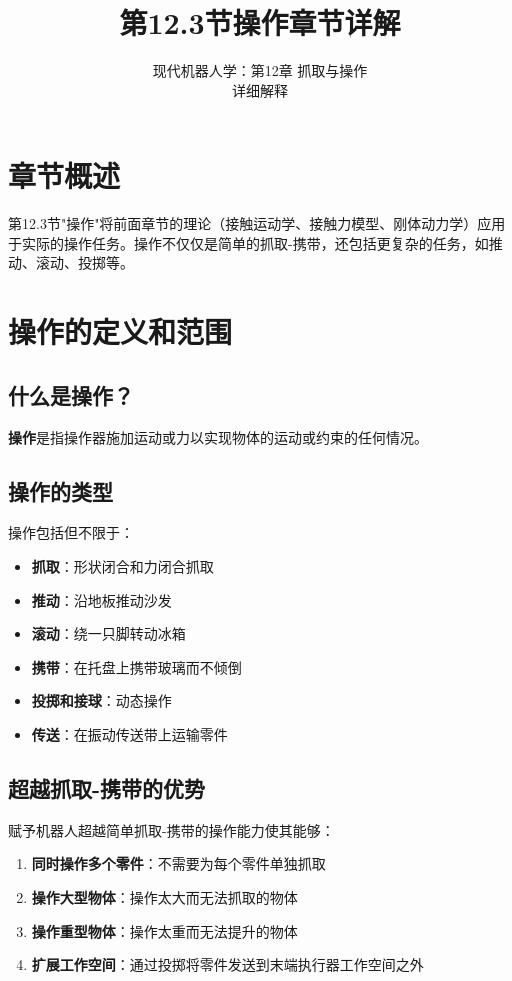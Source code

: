 \documentclass[12pt,a4paper]{article}
\title{第12.3节\quad 操作\quad 章节详解}
\author{现代机器人学：第12章 抓取与操作\\
详细解释}
\date{}
\begin{document}
\maketitle

\tableofcontents
\newpage

\section{章节概述}

第12.3节"操作"将前面章节的理论（接触运动学、接触力模型、刚体动力学）应用于实际的操作任务。操作不仅仅是简单的抓取-携带，还包括更复杂的任务，如推动、滚动、投掷等。

\section{操作的定义和范围}

\subsection{什么是操作？}

\textbf{操作}是指操作器施加运动或力以实现物体的运动或约束的任何情况。

\subsection{操作的类型}

操作包括但不限于：

\begin{itemize}
    \item \textbf{抓取}：形状闭合和力闭合抓取
    \item \textbf{推动}：沿地板推动沙发
    \item \textbf{滚动}：绕一只脚转动冰箱
    \item \textbf{携带}：在托盘上携带玻璃而不倾倒
    \item \textbf{投掷和接球}：动态操作
    \item \textbf{传送}：在振动传送带上运输零件
\end{itemize}

\subsection{超越抓取-携带的优势}

赋予机器人超越简单抓取-携带的操作能力使其能够：

\begin{enumerate}
    \item \textbf{同时操作多个零件}：不需要为每个零件单独抓取
    \item \textbf{操作大型物体}：操作太大而无法抓取的物体
    \item \textbf{操作重型物体}：操作太重而无法提升的物体
    \item \textbf{扩展工作空间}：通过投掷将零件发送到末端执行器工作空间之外
\end{enumerate}
\end{document}

